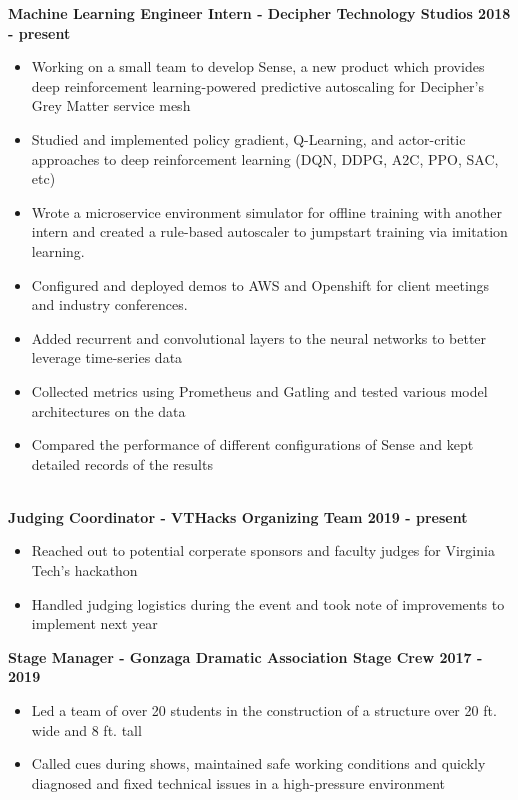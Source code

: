 \documentclass{article}
\begin{document}
\begin{center}
\begin{flushleft}
    \textbf{Machine Learning Engineer Intern - Decipher Technology Studios \hfill 2018 - present}
    \begin{itemize}
      \itemsep0em
      \item Working on a small team to develop Sense, a new product which provides deep reinforcement learning-powered predictive autoscaling for Decipher’s Grey Matter service mesh
      \item Studied and implemented policy gradient, Q-Learning, and actor-critic approaches to deep reinforcement learning (DQN, DDPG, A2C, PPO, SAC, etc)
      \item Wrote a microservice environment simulator for offline training with another intern and created a rule-based autoscaler to jumpstart training via imitation learning.
      \item Configured and deployed demos to AWS and Openshift for client meetings and industry conferences.
      \item Added recurrent and convolutional layers to the neural networks to better leverage time-series data
      \item Collected metrics using Prometheus and Gatling and tested various model architectures on the data
      \item Compared the performance of different configurations of Sense and kept detailed records of the results
    \end{itemize}


    {\large\textbf{\underline{}}} \\
    
    \textbf{Judging Coordinator - VTHacks Organizing Team \hfill 2019 - present}
    \begin{itemize}
      \itemsep0em
      \item Reached out to potential corperate sponsors and faculty judges for Virginia Tech's hackathon
      \item Handled judging logistics during the event and took note of improvements to implement next year
    \end{itemize}
    
    \textbf{Stage Manager - Gonzaga Dramatic Association Stage Crew \hfill 2017 - 2019}
    \begin{itemize}
      \itemsep0em
      \item Led a team of over 20 students in the construction of a structure over 20 ft. wide and 8 ft. tall
      \item Called cues during shows, maintained safe working conditions and quickly diagnosed and fixed technical issues in a high-pressure environment
    \end{itemize}


\end{flushleft}
\end{center}
\end{document}
